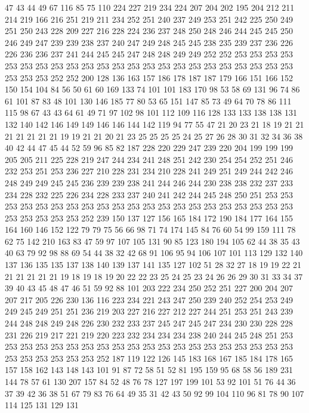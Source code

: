 47 43 44 49 67 116 85 75 110 224 227 219 234 224 207 204 202 195 204 212
211 214 219 166 216 251 219 211 234 252 251 240 237 249 253 251 242 225 250 249
251 250 243 228 209 227 216 228 224 236 237 248 250 248 246 244 245 245 250 246
249 247 239 239 238 237 240 247 249 248 245 245 238 235 239 237 236 226 226 236
236 237 241 244 245 245 247 248 248 249 249 252 252 253 253 253 253 253 253 253
253 253 253 253 253 253 253 253 253 253 253 253 253 253 253 253 253 253 253 252
252 200 128 136 163 157 186 178 187 187 179 166 151 166 152 150 154 104 84 56
50 61 60 169 133 74 101 101 183 170 98 53 58 69 131 96 74 86 61 101
87 83 48 101 130 146 185 77 80 53 65 151 147 85 73 49 64 70 78 86
111 115 98 67 43 43 64 61 49 71 97 102 98 101 112 109 116 128 133 133
138 138 131 132 140 142 146 149 149 146 146 144 142 119 94 77 55 47 21 20
23 21 18 19 21 21 21 21 21 21 21 19 19 21 21 20 21 23 25 25
25 25 24 25 27 26 28 30 31 32 34 36 38 40 42 44 47 45 44 52
59 96 85 82 187 228 220 229 247 239 220 204 199 199 199 205 205 211 225 228
219 247 244 234 241 248 251 242 230 254 254 252 251 246 232 253 251 253 236 227
210 228 231 234 210 228 241 249 251 249 244 242 246 248 249 249 245 245 236 239
239 238 241 244 246 244 230 238 238 232 237 233 234 228 232 225 226 234 228 233
237 240 241 242 244 245 248 250 251 253 253 253 253 253 253 253 253 253 253 253
253 253 253 253 253 253 253 253 253 253 253 253 253 253 253 252 239 150 137 127
156 165 184 172 190 184 177 164 155 164 160 146 152 122 79 79 75 56 66 98
71 74 174 145 84 76 60 54 99 159 111 78 62 75 142 210 163 83 47 59
97 107 105 131 90 85 123 180 194 105 62 44 38 35 43 40 63 79 92 98
88 69 54 44 38 32 42 68 91 106 95 94 106 107 101 113 129 132 140 137
136 135 135 137 138 140 139 137 141 135 127 102 51 28 32 27 18 19 19 22
21 21 21 21 21 21 19 18 19 18 19 20 22 22 23 25 24 25 23 24
26 26 29 30 31 33 34 37 39 40 43 45 48 47 46 51 59 92 88 101
203 222 234 250 252 251 227 200 204 207 207 217 205 226 230 136 116 223 234 221
243 247 250 239 240 252 254 253 249 249 245 249 251 251 236 219 203 227 216 227
212 227 244 251 253 251 243 239 244 248 248 249 248 226 230 232 233 237 245 247
245 247 234 230 230 228 228 231 226 219 217 221 219 220 223 232 234 234 234 238
240 244 245 248 251 253 253 253 253 253 253 253 253 253 253 253 253 253 253 253
253 253 253 253 253 253 253 253 253 253 253 252 187 119 122 126 145 183 168 167
185 184 178 165 157 158 162 143 148 143 101 91 87 72 58 51 52 81 195 159
95 68 58 56 189 231 144 78 57 61 130 207 157 84 52 48 76 78 127 197
199 101 53 92 101 51 76 44 36 37 39 42 36 38 51 67 79 83 76 64
49 35 31 42 43 50 92 99 104 110 96 81 78 90 107 114 125 131 129 131
